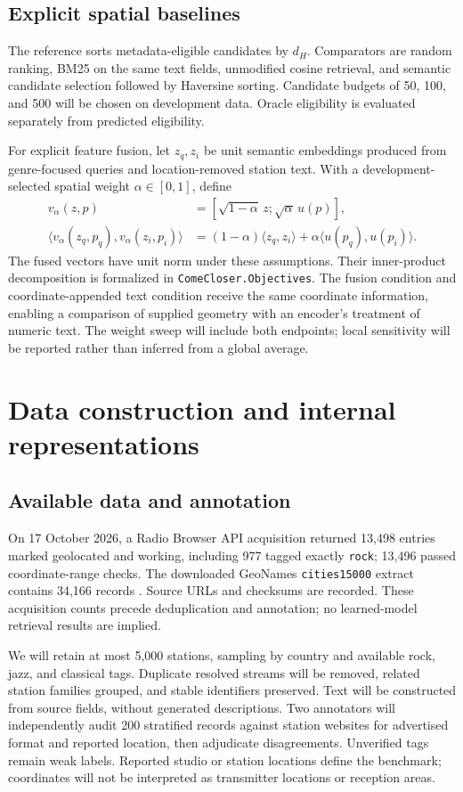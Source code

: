 \documentclass[10pt]{article}
\begin{document}
\subsection{Explicit spatial baselines}
The reference sorts metadata-eligible candidates by $d_H$. Comparators are random ranking, BM25 on the same text fields, unmodified cosine retrieval, and semantic candidate selection followed by Haversine sorting. Candidate budgets of 50, 100, and 500 will be chosen on development data. Oracle eligibility is evaluated separately from predicted eligibility.

For explicit feature fusion, let $z_q,z_i$ be unit semantic embeddings produced from genre-focused queries and location-removed station text. With a development-selected spatial weight $\alpha\in[0,1]$, define
\begin{align}
v_\alpha(z,p)&=[\sqrt{1-\alpha}\,z;\sqrt\alpha\,u(p)],\label{eq:fusionvector}\\
\langle v_\alpha(z_q,p_q),v_\alpha(z_i,p_i)\rangle
 &=(1-\alpha)\langle z_q,z_i\rangle+
   \alpha\langle u(p_q),u(p_i)\rangle.
\label{eq:fusionscore}
\end{align}
The fused vectors have unit norm under these assumptions. Their inner-product decomposition is formalized in \texttt{ComeCloser.Objectives}. The fusion condition and coordinate-appended text condition receive the same coordinate information, enabling a comparison of supplied geometry with an encoder's treatment of numeric text. The weight sweep will include both endpoints; local sensitivity will be reported rather than inferred from a global average.

\section{Data construction and internal representations}
\subsection{Available data and annotation}
On 17 October 2026, a Radio Browser API acquisition returned 13,498 entries marked geolocated and working, including 977 tagged exactly \texttt{rock}; 13,496 passed coordinate-range checks. The downloaded GeoNames \texttt{cities15000} extract contains 34,166 records \citep{radiobrowser,geonames}. Source URLs and checksums are recorded. These acquisition counts precede deduplication and annotation; no learned-model retrieval results are implied.

We will retain at most 5,000 stations, sampling by country and available rock, jazz, and classical tags. Duplicate resolved streams will be removed, related station families grouped, and stable identifiers preserved. Text will be constructed from source fields, without generated descriptions. Two annotators will independently audit 200 stratified records against station websites for advertised format and reported location, then adjudicate disagreements. Unverified tags remain weak labels. Reported studio or station locations define the benchmark; coordinates will not be interpreted as transmitter locations or reception areas.
\end{document}
